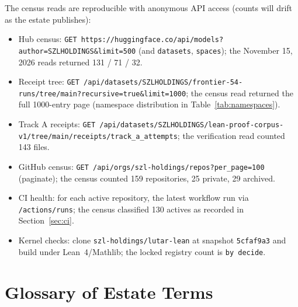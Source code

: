 ﻿\documentclass[11pt]{article}
\begin{document}
The census reads are reproducible with anonymous API access (counts will drift as the estate publishes):
\begin{itemize}
\item Hub census: \texttt{GET https://huggingface.co/api/models?author=SZLHOLDINGS\&limit=500} (and \texttt{datasets}, \texttt{spaces}); the November 15, 2026 reads returned 131 / 71 / 32.
\item Receipt tree: \texttt{GET /api/datasets/SZLHOLDINGS/frontier-54-runs/tree/main?recursive=true\&limit=1000}; the census read returned the full 1000-entry page (namespace distribution in Table~\ref{tab:namespaces}).
\item Track A receipts: \texttt{GET /api/datasets/SZLHOLDINGS/lean-proof-corpus-v1/tree/main/receipts/track\_a\_attempts}; the verification read counted 143 files.
\item GitHub census: \texttt{GET /api/orgs/szl-holdings/repos?per\_page=100} (paginate); the census counted 159 repositories, 25 private, 29 archived.
\item CI health: for each active repository, the latest workflow run via \texttt{/actions/runs}; the census classified 130 actives as recorded in Section~\ref{sec:ci}.
\item Kernel checks: clone \texttt{szl-holdings/lutar-lean} at snapshot \texttt{5cfaf9a3} and build under Lean~4/Mathlib; the locked registry count is \texttt{by decide}.
\end{itemize}

\section{Glossary of Estate Terms}
\label{app:glossary}
\end{document}
